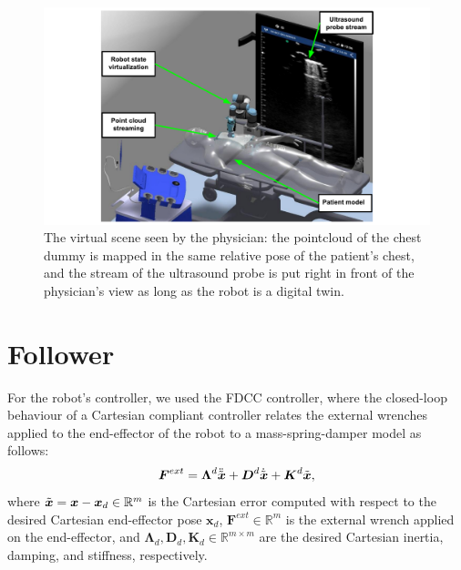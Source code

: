 \begin{figure}[t]
    \centering
    \includegraphics[width=0.9\columnwidth,trim={3.2cm 0 3.2cm 0},clip]{images/framework/env2.pdf}
    \caption{The virtual scene seen by the physician: the pointcloud of the chest dummy is mapped in the same relative pose of the patient's chest, and the stream of the ultrasound probe is put right in front of the physician's view as long as the robot is a digital twin.}
    \label{fig:vrenv}
\end{figure}


\section{Follower}
For the robot's controller, we used the FDCC controller\cite{scherzinger2017forward}, where the closed-loop behaviour of a Cartesian compliant controller relates the external wrenches applied to the end-effector of the robot to a mass-spring-damper model as follows:
\begin{equation}
\boldsymbol{F}^{ext} = \boldsymbol{\Lambda}^d\ddot{\Tilde{\boldsymbol{x}}} + \boldsymbol{D}^d\dot{\Tilde{\boldsymbol{x}}} + \boldsymbol{K}^d\Tilde{\boldsymbol{x}},
    \label{eq:cartesian_impedance_inertia_shaping}
\end{equation}
where $\Tilde{\boldsymbol{x}} = \boldsymbol{x} - \boldsymbol{x}_d \in\mathbb{R}^{m}$ is the Cartesian error computed with respect to the desired Cartesian end-effector pose $\boldsymbol{x}_d$, $\boldsymbol{F}^{ext}\in\mathbb{R}^{m}$ is the external wrench applied on the end-effector, and $\boldsymbol{\Lambda}_d, \boldsymbol{D}_d ,\boldsymbol{K}_d\in\mathbb{R}^{m\times m}$ are the desired Cartesian inertia, damping, and stiffness, respectively. %

